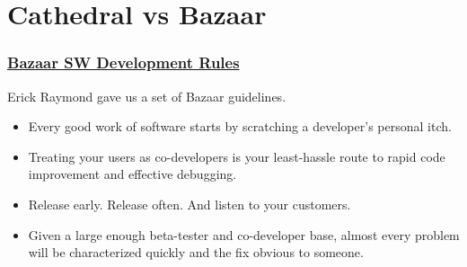 \documentclass[hyperref={pdfpagelabels=false},xcolor=pst,pdf,fragile]{beamer}
\begin{document}
\section{Cathedral vs Bazaar}


\begin{frame}
  \frametitle{
	  \href{https://en.wikipedia.org/wiki/The_Cathedral_and_the_Bazaar\#Guidelines_for_creating_good_open_source_software}
	  {Bazaar SW Development Rules}
  }

  Erick Raymond gave us a set of Bazaar guidelines.
  \begin{itemize}
	  \pause
	\item Every good work of software starts by scratching a developer's
	  personal itch.

	  \pause
	\item Treating your users as co-developers is your least-hassle route
	  to rapid code improvement and effective debugging.

	  \pause
	\item Release early. Release often. And listen to your customers.

	\pause
	\item Given a large enough beta-tester and co-developer base, almost
	  every problem will be characterized quickly and the fix obvious to
	  someone.

  \end{itemize}

\end{frame}
\end{document}
